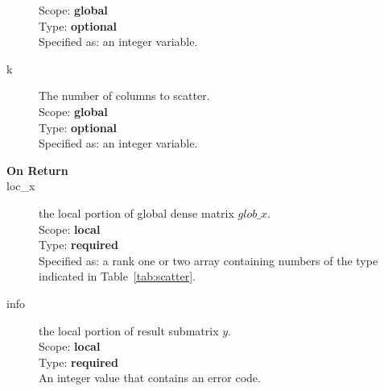 \begin{description}
Scope: {\bf global} \\
Type: {\bf optional}\\
Specified as: an integer variable.
\item[k]  The number of columns to scatter.\\
Scope: {\bf global} \\
Type: {\bf optional}\\
Specified as: an integer variable. 
\item[\bf On Return] 
\item[loc\_x] the local portion of global dense matrix
$glob\_x$. \\
Scope: {\bf local} \\
Type: {\bf required}\\
Specified as: a rank one or two array containing numbers of the type
indicated in Table~\ref{tab:scatter}.
\item[info] the local portion of result submatrix $y$.\\
Scope: {\bf local} \\
Type: {\bf required} \\
An integer value that contains an error code. 
\end{description}

